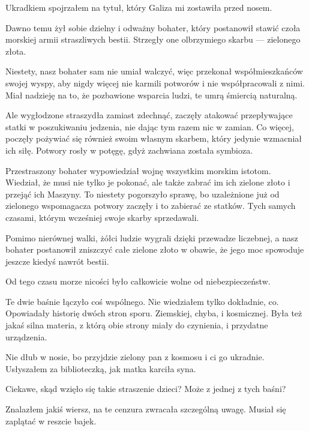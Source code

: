 Ukradkiem spojrzałem na tytuł, który Galiza mi zostawiła przed nosem.

\begin{poem}
	Dawno temu żył sobie dzielny i odważny bohater, który postanowił stawić czoła morskiej armii straszliwych bestii. Strzegły one olbrzymiego skarbu --- zielonego złota.
	
	Niestety, nasz bohater sam nie umiał walczyć, więc przekonał współmieszkańców swojej wyspy, aby nigdy więcej nie karmili potworów i nie współpracowali z nimi. Miał nadzieję na to, że pozbawione wsparcia ludzi, te umrą śmiercią naturalną.
	
	Ale wygłodzone straszydła zamiast zdechnąć, zaczęły atakować przepływające statki w poszukiwaniu jedzenia, nie dając tym razem nic w zamian. Co więcej, poczęły pożywiać się również swoim własnym skarbem, który jedynie wzmacniał ich siłę. Potwory rosły w potęgę, gdyż zachwiana została symbioza.
	
	Przestraszony bohater wypowiedział wojnę wszystkim morskim istotom. Wiedział, że musi nie tylko je pokonać, ale także zabrać im ich zielone złoto i przejąć ich Maszyny.
	To niestety pogorszyło sprawę, bo uzależnione już od zielonego wspomagacza potwory zaczęły i to zabierać ze statków. Tych samych czasami, którym wcześniej swoje skarby sprzedawali.
	
	Pomimo nierównej walki, żółci ludzie wygrali dzięki przewadze liczebnej, a nasz bohater postanowił zniszczyć całe zielone złoto w obawie, że jego moc spowoduje jeszcze kiedyś nawrót bestii.
	
	Od tego czasu morze nicości było całkowicie wolne od niebezpieczeństw.
\end{poem}

Te dwie baśnie łączyło coś wspólnego. Nie wiedziałem tylko dokładnie, co. Opowiadały historię dwóch stron sporu. Ziemskiej, chyba, i kosmicznej.
Była też jakaś silna materia, z którą obie strony miały do czynienia, i przydatne urządzenia.

\begin{dialogue}
	\ds{} Nie dłub w nosie, bo przyjdzie zielony pan z kosmosu i ci go ukradnie. \dm{} Usłyszałem za biblioteczką, jak matka karciła syna.
\end{dialogue}

Ciekawe, skąd wzięło się takie straszenie dzieci? Może z jednej z tych baśni? 

Znalazłem jakiś wiersz, na te cenzura zwracała szczególną uwagę. Musiał się zaplątać w reszcie bajek.

